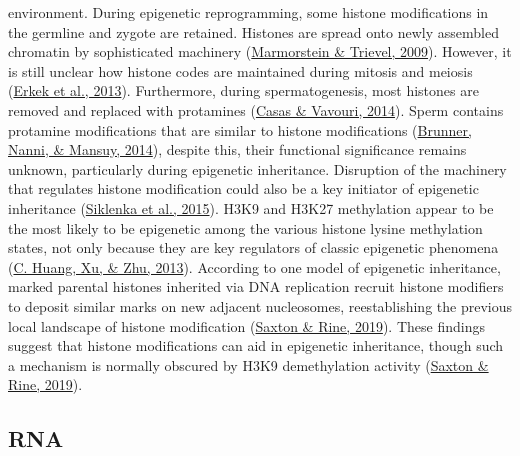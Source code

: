 \documentclass[12pt,twoside]{reedthesis}
\begin{document}
environment. During epigenetic reprogramming, some histone modifications
in the germline and zygote are retained. Histones are spread onto newly
assembled chromatin by sophisticated machinery (\protect\hyperlink{ref-marmorstein2009}{Marmorstein \& Trievel, 2009}).
However, it is still unclear how histone codes are maintained during
mitosis and meiosis (\protect\hyperlink{ref-erkek2013}{Erkek et al., 2013}). Furthermore, during spermatogenesis,
most histones are removed and replaced with protamines (\protect\hyperlink{ref-casas2014}{Casas \& Vavouri, 2014}).
Sperm contains protamine modifications that are similar to histone
modifications (\protect\hyperlink{ref-brunner2014}{Brunner, Nanni, \& Mansuy, 2014}), despite this, their functional
significance remains unknown, particularly during epigenetic
inheritance. Disruption of the machinery that regulates histone
modification could also be a key initiator of epigenetic inheritance (\protect\hyperlink{ref-siklenka2015}{Siklenka et al., 2015}). H3K9
and H3K27 methylation appear to be the most likely to be epigenetic
among the various histone lysine methylation states, not only because
they are key regulators of classic epigenetic phenomena (\protect\hyperlink{ref-huang2013}{C. Huang, Xu, \& Zhu, 2013}).
According to one model of epigenetic inheritance, marked parental
histones inherited via DNA replication recruit histone modifiers to
deposit similar marks on new adjacent nucleosomes, reestablishing the
previous local landscape of histone modification (\protect\hyperlink{ref-saxton2019}{Saxton \& Rine, 2019}). These
findings suggest that histone modifications can aid in epigenetic
inheritance, though such a mechanism is normally obscured by H3K9
demethylation activity (\protect\hyperlink{ref-saxton2019}{Saxton \& Rine, 2019}).

\hypertarget{rna}{%
\subsection*{RNA}\label{rna}}
\end{document}
